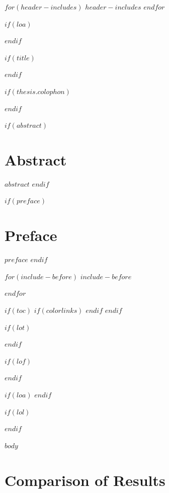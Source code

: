 $for(header-includes)$
  $header-includes$
$endfor$

$if(loa)$
\makeglossaries

$endif$



$if(title)$
\prefrontmatter

\cleartoevenpage

$endif$

$if(thesis.colophon)$

\cleartooddpage
$endif$

\frontmatter

$if(abstract)$
\chapter*{Abstract}
\setcounter{chapter}{0}
$abstract$
\clearforchapter
$endif$

$if(preface)$
\chapter*{Preface}
\setcounter{chapter}{0}
$preface$
\clearforchapter
$endif$

$for(include-before)$
$include-before$

$endfor$

$if(toc)$
{
$if(colorlinks)$
  \hypersetup{linkcolor=$if(toccolor)$$toccolor$$else$black$endif$}
$endif$
\setcounter{tocdepth}{$toc-depth$}
\tableofcontents
}
\clearforchapter
$endif$

$if(lot)$
\listoftables
\clearforchapter
$endif$

$if(lof)$
\listoffigures
\clearforchapter
$endif$

$if(loa)$
$endif$

$if(lol)$
\listoflistings
{}
\clearforchapter
$endif$

\mainmatter
$body$

\appendix
\chapter{Comparison of Results}\label{app:comparison_of_results}

